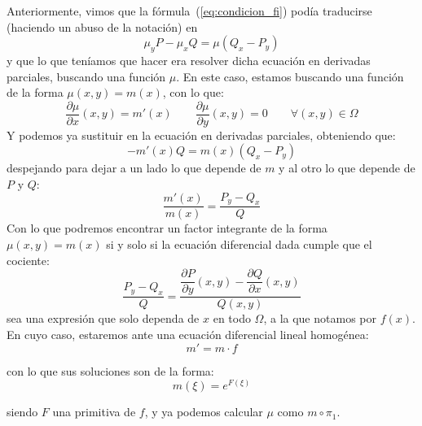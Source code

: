 \noindent
Anteriormente, vimos que la fórmula~(\ref{eq:condicion_fi}) podía traducirse (haciendo un abuso de la notación) en
\begin{equation*}
    \mu_y P -\mu_x Q = \mu(Q_x - P_y)
\end{equation*}
y que lo que teníamos que hacer era resolver dicha ecuación en derivadas parciales, buscando una función $\mu$. En este caso, estamos buscando una función de la forma $\mu(x,y)=m(x)$, con lo que:
\begin{equation*}
    \dfrac{\partial \mu}{\partial x}(x,y) = m'(x) \qquad \dfrac{\partial \mu}{\partial y}(x,y) = 0 \qquad \forall (x,y)\in \Omega
\end{equation*}
Y podemos ya sustituir en la ecuación en derivadas parciales, obteniendo que:
\begin{equation*}
    -m'(x) Q = m(x) (Q_x-P_y)
\end{equation*}
despejando para dejar a un lado lo que depende de $m$ y al otro lo que depende de $P$ y $Q$:
\begin{equation*}
    \dfrac{m'(x)}{m(x)} = \dfrac{P_y-Q_x}{Q}
\end{equation*}
Con lo que podremos encontrar un factor integrante de la forma $\mu(x,y)=m(x)$ si y solo si la ecuación diferencial dada cumple que el cociente:
\begin{equation*}
    \dfrac{P_y-Q_x}{Q} = \dfrac{\dfrac{\partial P}{\partial y}(x,y)-\dfrac{\partial Q}{\partial x}(x,y)}{Q(x,y)}
\end{equation*}
sea una expresión que solo dependa de $x$ en todo $\Omega$, a la que notamos por $f(x)$. En cuyo caso, estaremos ante una ecuación diferencial lineal homogénea:
\begin{equation*}
    m' = m\cdot f
\end{equation*}

con lo que sus soluciones son de la forma:
\begin{equation*}
    m(\xi) = e^{F(\xi)}
\end{equation*}

siendo $F$ una primitiva de $f$, y ya podemos calcular $\mu$ como $m\circ \pi_1$.

